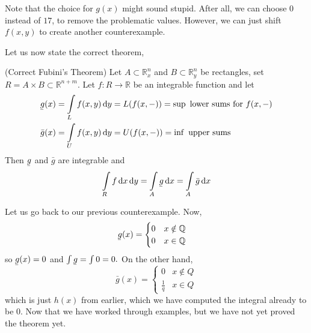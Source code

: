 \documentclass{article}
\newcommand{\ubar}[1]{\underaccent{\bar}{#1}}
\begin{document}
Note that the choice for $g(x)$ might sound stupid. After all, we can choose $0$ instead of $17$, to remove the problematic values. However, we can just shift $f(x,y)$ to create another counterexample.

Let us now state the correct theorem,
\begin{theorem}
    (Correct Fubini's Theorem) Let $A \subset \mathbb{R}_x^n$ and $B \subset \mathbb{R}_y^n$ be rectangles, set $R=A\times B \subset \mathbb{R}^{n+m}$. Let $f:R\rightarrow \mathbb{R}$ be an integrable function and let
    \begin{align}
        \ubar{g}(x) & = \int\limits_L f(x,y) \dd{y} = L(f(x,-)) = \sup \text{ lower sums for } f(x,-) \\
        \bar{g}(x)  & = \int\limits_U f(x,y) \dd{y} = U(f(x,-)) = \inf \text{ upper sums}
    \end{align}
    Then $\ubar{g}$ and $\bar{g}$ are integrable and
    \begin{equation}
        \int\limits_R f\dd{x}\dd{y} = \int\limits_A \ubar{g} \dd{x} = \int\limits_A \bar{g} \dd{x}
    \end{equation}
\end{theorem}
Let us go back to our previous counterexample. Now,
\begin{align}
    \ubar{g}(x) & = \begin{cases}
        0 & x\notin \mathbb{Q} \\
        0 & x\in \mathbb{Q}
    \end{cases}
\end{align}
so $\ubar{g}(x)=0$ and $\int \ubar{g} = \int 0 = 0.$ On the other hand,
\begin{equation}
    \bar{g}(x) = \begin{cases}
        0           & x\not\in Q \\
        \frac{1}{q} & x \in Q
    \end{cases}
\end{equation}
which is just $h(x)$ from earlier, which we have computed the integral already to be $0$. Now that we have worked through examples, but we have not yet proved the theorem yet.
\end{document}
